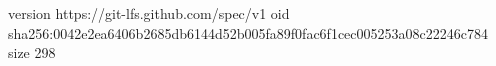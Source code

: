 version https://git-lfs.github.com/spec/v1
oid sha256:0042e2ea6406b2685db6144d52b005fa89f0fac6f1cec005253a08c22246c784
size 298

